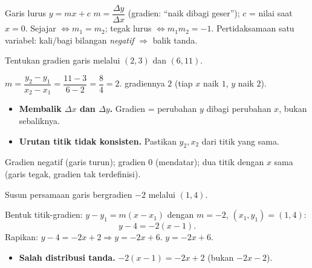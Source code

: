 \begin{ingat}{Garis lurus $y=mx+c$}
$m=\dfrac{\Delta y}{\Delta x}$ (gradien: ``naik dibagi geser''); $c$ = nilai saat
$x=0$. Sejajar $\iff m_1=m_2$; tegak lurus $\iff m_1 m_2=-1$. Pertidaksamaan
satu variabel: kali/bagi bilangan \emph{negatif} $\Rightarrow$ balik tanda.
\end{ingat}

\begin{soalbox}{}
Tentukan gradien garis melalui $(2,3)$ dan $(6,11)$.
\end{soalbox}

\jawab
{} $m=\dfrac{y_2-y_1}{x_2-x_1}=\dfrac{11-3}{6-2}=\dfrac{8}{4}=2$.
\jadi gradiennya $2$ (tiap $x$ naik $1$, $y$ naik $2$).

\begin{jebakan}
\begin{itemize}[leftmargin=*,topsep=2pt]
  \item \textbf{Membalik $\Delta x$ dan $\Delta y$.} Gradien = perubahan
  \emph{$y$} dibagi perubahan \emph{$x$}, bukan sebaliknya.
  \item \textbf{Urutan titik tidak konsisten.} Pastikan $y_2,x_2$ dari titik yang
  sama.
\end{itemize}
\end{jebakan}

\begin{variasi}
Gradien negatif (garis turun); gradien $0$ (mendatar); dua titik dengan $x$ sama
(garis tegak, gradien tak terdefinisi).
\end{variasi}

\begin{soalbox}{}
Susun persamaan garis bergradien $-2$ melalui $(1,4)$.
\end{soalbox}

\jawab
{} Bentuk titik-gradien: $y-y_1=m(x-x_1)$ dengan $m=-2$, $(x_1,y_1)=(1,4)$:
\[
y-4=-2(x-1).
\]
 Rapikan: $y-4=-2x+2\Rightarrow y=-2x+6$.
\jadi $y=-2x+6$.

\begin{jebakan}
\begin{itemize}[leftmargin=*,topsep=2pt]
  \item \textbf{Salah distribusi tanda.} $-2(x-1)=-2x+2$ (bukan $-2x-2$).
\end{itemize}
\end{jebakan}

